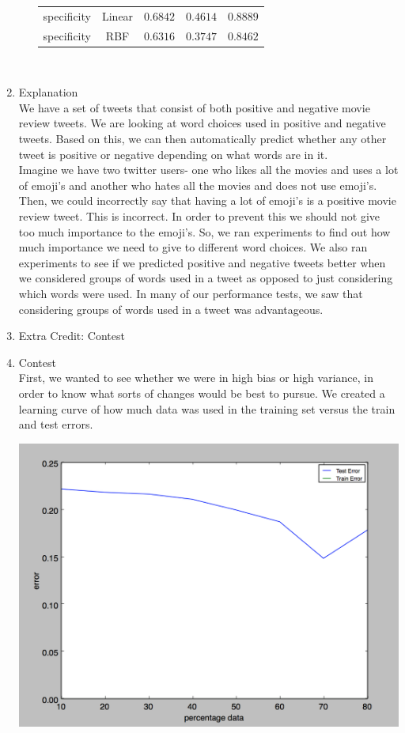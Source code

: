 \documentclass[11pt]{article}
\begin{document}
\begin{enumerate}
\begin{enumerate}[(a)]
\begin{tabular}{| c | c | c | c | c |}
specificity & Linear & $0.6842$ & $0.4614$ & $0.8889$ \\
specificity & RBF & $0.6316$ & $0.3747$ & $0.8462$ \\
\hline
\end{tabular} \\
\end{enumerate}
\item Explanation \\
We have a set of tweets that consist of both positive and negative movie review tweets. We are looking at word choices used in positive and negative tweets. Based on this, we can then automatically predict whether any other tweet is positive or negative depending on what words are in it. \\
Imagine we have two twitter users- one who likes all the movies and uses a lot of emoji's and another who hates all the movies and does not use emoji's. Then, we could incorrectly say that having a lot of emoji's is a positive movie review tweet. This is incorrect. In order to prevent this we should not give too much importance to the emoji's. So, we ran experiments to find out how much importance we need to give to different word choices. 
We also ran experiments to see if we predicted positive and negative tweets better when we considered groups of words used in a tweet as opposed to just considering which words were used. In many of our performance tests, we saw that considering groups of words used in a tweet was advantageous. 
\item Extra Credit: Contest
\item Contest\\
First, we wanted to see whether we were in high bias or high variance, in order to know what sorts of changes
would be best to pursue. We created a learning curve of how much data was used in the training set versus
the train and test errors.

\includegraphics[scale=0.7]{learningcurve}


\end{enumerate}
\end{document}
